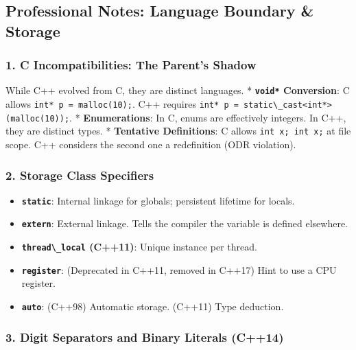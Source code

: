 \hypertarget{professional-notes-language-boundary-storage}{%
\subsection{Professional Notes: Language Boundary \&
Storage}\label{professional-notes-language-boundary-storage}}

\hypertarget{c-incompatibilities-the-parents-shadow}{%
\subsubsection{1. C Incompatibilities: The Parent's
Shadow}\label{c-incompatibilities-the-parents-shadow}}

While C++ evolved from C, they are distinct languages. *
\textbf{\passthrough{\lstinline!void*!} Conversion}: C allows
\passthrough{\lstinline!int* p = malloc(10);!}. C++ requires
\passthrough{\lstinline!int* p = static\_cast<int*>(malloc(10));!}. *
\textbf{Enumerations}: In C, enums are effectively integers. In C++,
they are distinct types. * \textbf{Tentative Definitions}: C allows
\passthrough{\lstinline!int x; int x;!} at file scope. C++ considers the
second one a redefinition (ODR violation).

\hypertarget{storage-class-specifiers}{%
\subsubsection{2. Storage Class
Specifiers}\label{storage-class-specifiers}}

\begin{itemize}
\tightlist
\item
  \textbf{\passthrough{\lstinline!static!}}: Internal linkage for
  globals; persistent lifetime for locals.
\item
  \textbf{\passthrough{\lstinline!extern!}}: External linkage. Tells the
  compiler the variable is defined elsewhere.
\item
  \textbf{\passthrough{\lstinline!thread\_local!} (C++11)}: Unique
  instance per thread.
\item
  \textbf{\passthrough{\lstinline!register!}}: (Deprecated in C++11,
  removed in C++17) Hint to use a CPU register.
\item
  \textbf{\passthrough{\lstinline!auto!}}: (C++98) Automatic storage.
  (C++11) Type deduction.
\end{itemize}

\hypertarget{digit-separators-and-binary-literals-c14}{%
\subsubsection{3. Digit Separators and Binary Literals
(C++14)}\label{digit-separators-and-binary-literals-c14}}

